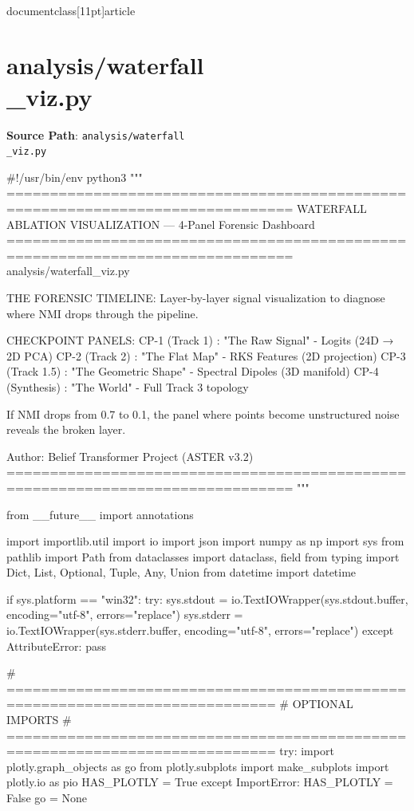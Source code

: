 \\documentclass[11pt]{article}
\begin{document}
\section*{analysis/waterfall\\_viz.py}
\textbf{Source Path}: \texttt{analysis/waterfall\\_viz.py}\par
\bigskip
\begin{CodeBlock}
#!/usr/bin/env python3
"""
===============================================================================
WATERFALL ABLATION VISUALIZATION — 4-Panel Forensic Dashboard
===============================================================================
analysis/waterfall_viz.py

THE FORENSIC TIMELINE: Layer-by-layer signal visualization to diagnose where
NMI drops through the pipeline.

CHECKPOINT PANELS:
    CP-1 (Track 1)   : "The Raw Signal"      - Logits (24D → 2D PCA)
    CP-2 (Track 2)   : "The Flat Map"        - RKS Features (2D projection)
    CP-3 (Track 1.5) : "The Geometric Shape" - Spectral Dipoles (3D manifold)
    CP-4 (Synthesis) : "The World"           - Full Track 3 topology

If NMI drops from 0.7 to 0.1, the panel where points become unstructured
noise reveals the broken layer.

Author: Belief Transformer Project (ASTER v3.2)
===============================================================================
"""

from __future__ import annotations

import importlib.util
import io
import json
import numpy as np
import sys
from pathlib import Path
from dataclasses import dataclass, field
from typing import Dict, List, Optional, Tuple, Any, Union
from datetime import datetime

if sys.platform == "win32":
    try:
        sys.stdout = io.TextIOWrapper(sys.stdout.buffer, encoding="utf-8", errors="replace")
        sys.stderr = io.TextIOWrapper(sys.stderr.buffer, encoding="utf-8", errors="replace")
    except AttributeError:
        pass

# =============================================================================
# OPTIONAL IMPORTS
# =============================================================================
try:
    import plotly.graph_objects as go
    from plotly.subplots import make_subplots
    import plotly.io as pio
    HAS_PLOTLY = True
except ImportError:
    HAS_PLOTLY = False
    go = None


\end{CodeBlock}
\end{document}

